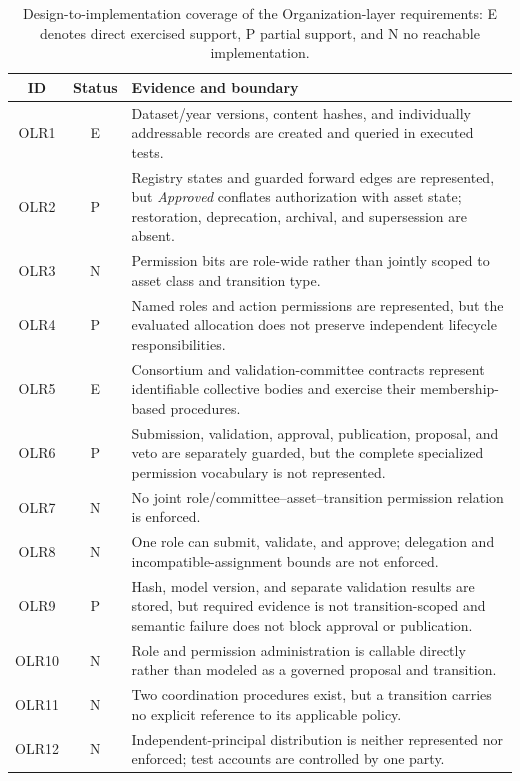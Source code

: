 \documentclass[journal]{IEEEtran}
\begin{document}
\begin{table}[t]
\centering
\caption{Design-to-implementation coverage of the Organization-layer requirements: E denotes direct exercised support, P partial support, and N no reachable implementation.}
\label{tab:olr_coverage}
\renewcommand{\arraystretch}{1.08}
\scriptsize
\begin{tabular}{@{}c c p{13.8cm}@{}}
\toprule
\textbf{ID} & \textbf{Status} & \textbf{Evidence and boundary} \\
\midrule
OLR1 & E & Dataset/year versions, content hashes, and individually addressable records are created and queried in executed tests. \\
OLR2 & P & Registry states and guarded forward edges are represented, but \emph{Approved} conflates authorization with asset state; restoration, deprecation, archival, and supersession are absent. \\
OLR3 & N & Permission bits are role-wide rather than jointly scoped to asset class and transition type. \\
OLR4 & P & Named roles and action permissions are represented, but the evaluated allocation does not preserve independent lifecycle responsibilities. \\
OLR5 & E & Consortium and validation-committee contracts represent identifiable collective bodies and exercise their membership-based procedures. \\
OLR6 & P & Submission, validation, approval, publication, proposal, and veto are separately guarded, but the complete specialized permission vocabulary is not represented. \\
OLR7 & N & No joint role/committee--asset--transition permission relation is enforced. \\
OLR8 & N & One role can submit, validate, and approve; delegation and incompatible-assignment bounds are not enforced. \\
OLR9 & P & Hash, model version, and separate validation results are stored, but required evidence is not transition-scoped and semantic failure does not block approval or publication. \\
OLR10 & N & Role and permission administration is callable directly rather than modeled as a governed proposal and transition. \\
OLR11 & N & Two coordination procedures exist, but a transition carries no explicit reference to its applicable policy. \\
OLR12 & N & Independent-principal distribution is neither represented nor enforced; test accounts are controlled by one party. \\
\bottomrule
\end{tabular}
\end{table}
\end{document}
